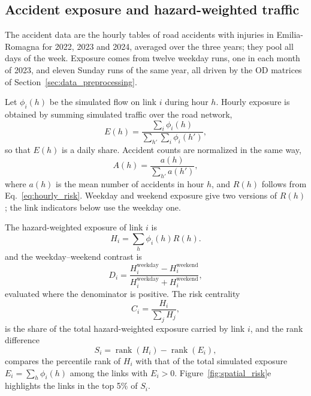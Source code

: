 \documentclass[pdflatex,Numbered]{sn-jnl}
\begin{document}
\subsection{Accident exposure and hazard-weighted traffic}

The accident data are the hourly tables of road accidents with injuries in Emilia-Romagna for 2022, 2023 and 2024, averaged over the three years; they pool all days of the week. Exposure comes from twelve weekday runs, one in each month of 2023, and eleven Sunday runs of the same year, all driven by the OD matrices of Section~\ref{sec:data_preprocessing}.

Let $\phi_i(h)$ be the simulated flow on link $i$ during hour $h$. Hourly exposure is obtained by summing simulated traffic over the road network,
\begin{equation}
  E(h) =
  \frac{\sum_i \phi_i(h)}
       {\sum_{h'}\sum_i \phi_i(h')} ,
  \label{eq:exposure_share}
\end{equation}
so that $E(h)$ is a daily share. Accident counts are normalized in the same way,
\begin{equation}
  A(h) =
  \frac{a(h)}
       {\sum_{h'} a(h')} ,
  \label{eq:accident_share}
\end{equation}
where $a(h)$ is the mean number of accidents in hour $h$, and $R(h)$ follows from Eq.~\eqref{eq:hourly_risk}. Weekday and weekend exposure give two versions of $R(h)$; the link indicators below use the weekday one.

The hazard-weighted exposure of link $i$ is
\begin{equation}
  H_i = \sum_h \phi_i(h) R(h) .
  \label{eq:hazard_weighted_exposure}
\end{equation}
and the weekday--weekend contrast is
\begin{equation}
  D_i =
  \frac{H_i^{\mathrm{weekday}} - H_i^{\mathrm{weekend}}}
       {H_i^{\mathrm{weekday}} + H_i^{\mathrm{weekend}}} ,
  \label{eq:weekday_weekend_hazard_difference}
\end{equation}
evaluated where the denominator is positive. The risk centrality
\begin{equation}
  C_i = \frac{H_i}{\sum_j H_j} ,
  \label{eq:risk_centrality}
\end{equation}
is the share of the total hazard-weighted exposure carried by link $i$, and the rank difference
\begin{equation}
  S_i = \operatorname{rank}(H_i) - \operatorname{rank}(E_i),
  \label{eq:hazard_anomaly}
\end{equation}
compares the percentile rank of $H_i$ with that of the total simulated exposure $E_i=\sum_h \phi_i(h)$ among the links with $E_i>0$. Figure~\ref{fig:spatial_risk}e highlights the links in the top 5\% of $S_i$.
\end{document}
